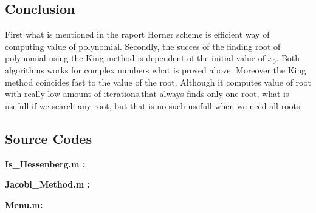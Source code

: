 \documentclass[12pt]{article}
\begin{document}
\begin{center}
\section{Conclusion}
\end{center}

\begin{flushleft}
First what is mentioned in the raport Horner scheme is efficient way of computing value of polynomial. Secondly, the succes of the finding root of polynomial using the King method is dependent of the initial value of $x_{0}$. Both algorithms works for complex numbers what is proved above. Moreover the King method coincides fast to the value of the root. Although it computes value of root with really low amount of iterations,that always finds only one root, what is usefull if we search any root, but that is no such usefull when we need all roots.
\end{flushleft}

\begin{center}
\item \section{Source Codes}
\end{center}

{\bf Is\_Hessenberg.m :}


\pagebreak

{\bf Jacobi\_Method.m :}


\pagebreak

{\bf Menu.m:}

\end{document}
